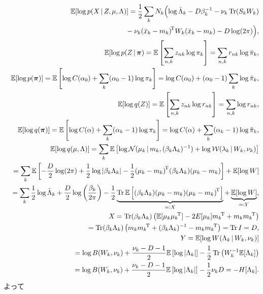 \begin{eqnarray*}&&
\EE[\log p(X\,|\,Z,\mu,\Lambda)]
 = \half \sum_k N_k \Bigl(\log \tilde{\Lambda}_k - D\beta_k^{-1} - \nu_k \tr(S_k W_k)\\
&&\hphantom{\EE[\log p(X\,|\,Z,\mu,\Lambda)] = \half \sum_k N_k \Bigl(}
 -\nu_k \quads{W_k}{(\bar{x}_k-m_k)} - D\log (2\pi)\Bigr),
\\&&
\EE[\log p(Z\,|\,\vpi)=\EE\left[\sum_{n,k} z_{nk} \log \pi_k\right] = \sum_{n,k} r_{nk} \log \tilde{\pi}_k,
\\&&
\EE[\log p(\vpi)]=\EE\left[\log C(\alpha_0)+\sum_k (\alpha_0-1)\log \pi_k\right]=\log C(\alpha_0)+(\alpha_0-1)\sum_k \log \tilde{\pi}_k,
\\&&
\EE[\log q(Z)]=\EE\left[\sum_{n,k} z_{nk} \log r_{nk}\right]=\sum_{n,k} \log r_{nk},
\\&&
\EE[\log q(\vpi)]=\EE\left[\log C(\alpha)+\sum_k (\alpha_k-1)\log \pi_k\right]=\log C(\alpha)+\sum_k(\alpha_k-1)\log \tilde{\pi}_k,
\\
&&\EE[\log q(\mu,\Lambda)]
= \sum_k \EE\left[\log \calN(\mu_k\,|\,m_k,(\beta_k \Lambda_k)^{-1})+\log \calW(\lambda_k\,|\,W_k,\nu_k)\right]\\
&&= \sum_k \EE\left[-\frac{D}{2} \log (2\pi)+\half \log |\beta_k \Lambda_k|
       - \half \quads{(\beta_k \Lambda_k)}{(\mu_k-m_k)}\right]+\EE[\log W]\\
&&= \sum_k \half \log \tilde{\Lambda}_k + \frac{D}{2}\log \left(\frac{\beta_k}{2\pi}\right) -
  \half \underbrace{\tr \EE\left[(\beta_k \Lambda_k)\outp{(\mu_k-m_k)}\right]}_{=:X} + \underbrace{\EE[\log W]}_{=:Y},
\\&&
X = \tr (\beta_k \Lambda_k)\left(\EE[\outp{\mu_k}]-2E[\mu_k]\trans{m_k} + \outp{m_k}\right)\\
&&\phantom{X}
  = \tr (\beta_k \Lambda_k)\left(\outp{m_k} + (\beta_k \Lambda_k)^{-1}-\outp{m_k}\right)
  = \tr I = D,
\\&&
Y = \EE[\log W(\Lambda_k\,|\,W_k,\nu_k)]\\
&&\phantom{Y}
  = \log B(W_k,\nu_k)+\frac{\nu_k-D-1}{2} \EE\left[\log |\Lambda_k|\right] - \half \tr \left(W_k^{-1} \EE[\Lambda_k]\right)\\
&&\phantom{Y}
  = \log B(W_k,\nu_k)+\frac{\nu_k-D-1}{2} \EE\left[\log |\Lambda_k|\right] - \half \nu_k D = -H[\Lambda_k].
\end{eqnarray*}
よって
